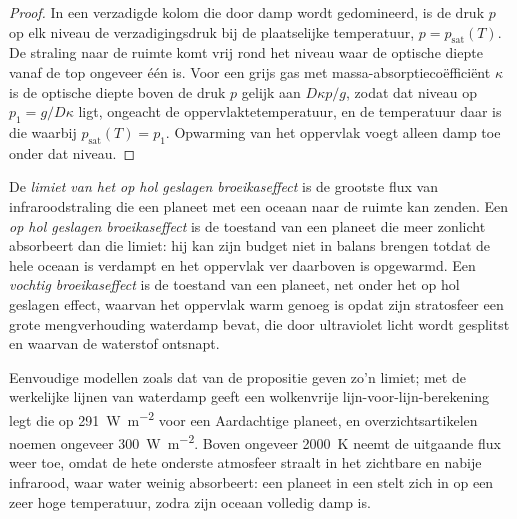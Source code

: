 \begin{proof}
In een verzadigde kolom die door damp wordt gedomineerd, is de druk $p$ op elk
niveau de verzadigingsdruk bij de plaatselijke temperatuur, $p =
p_\mathrm{sat}(T)$. De straling naar de ruimte komt vrij rond het niveau
waar de optische diepte vanaf de top ongeveer één is. Voor een grijs gas met
massa-absorptiecoëfficiënt $\kappa$ is de optische diepte boven de druk $p$
gelijk aan $D\kappa p/g$, zodat dat niveau op $p_1 = g/D\kappa$ ligt, ongeacht de
oppervlaktetemperatuur, en de temperatuur daar is die waarbij
$p_\mathrm{sat}(T) = p_1$. Opwarming van het oppervlak voegt alleen damp toe onder dat niveau.
\end{proof}

\begin{definition}\label{def:b3:planetary-atmospheres:runaway}
De \emph{limiet van het op hol geslagen broeikaseffect} is de
grootste flux van infraroodstraling die een planeet met een oceaan naar
de ruimte kan zenden. Een \emph{op hol geslagen broeikaseffect} is de toestand
van een planeet die meer zonlicht absorbeert dan die limiet: hij kan zijn budget niet in balans brengen
totdat de hele oceaan is verdampt en het oppervlak
ver daarboven is opgewarmd. Een \emph{vochtig broeikaseffect}
is de toestand van een planeet, net onder het op hol geslagen effect, waarvan het oppervlak warm
genoeg is opdat zijn stratosfeer een grote mengverhouding waterdamp bevat,
die door ultraviolet licht wordt gesplitst en waarvan de waterstof ontsnapt.
\end{definition}

Eenvoudige modellen zoals dat van de propositie geven zo'n limiet; met de
werkelijke lijnen van waterdamp geeft een wolkenvrije
lijn-voor-lijn-berekening legt die op \qty{291}{W.m^{-2}} voor een Aardachtige planeet, en
overzichtsartikelen noemen ongeveer \qty{300}{W.m^{-2}}. Boven ongeveer \qty{2000}{K} neemt de
uitgaande flux weer toe, omdat de hete onderste atmosfeer straalt in het
zichtbare en nabije infrarood, waar water weinig absorbeert: een planeet in een
 stelt zich in op een zeer hoge temperatuur, zodra zijn oceaan
volledig damp is.

